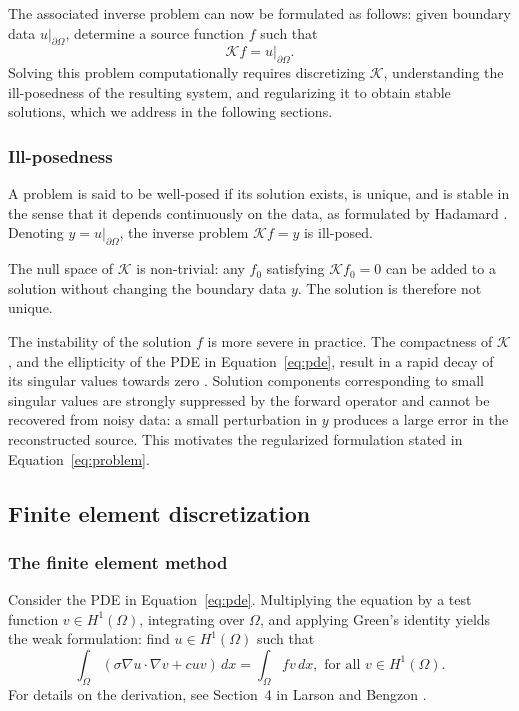 The associated inverse problem can now be formulated as follows: given boundary data $u|_{\partial\Omega}$, determine a source function $f$ such that
\begin{equation*}
    \mathcal{K} f = u|_{\partial\Omega}.
\end{equation*}
Solving this problem computationally requires discretizing $\mathcal{K}$, understanding the ill-posedness of the resulting system, and regularizing it to obtain stable solutions, which we address in the following sections.


\subsubsection{Ill-posedness}\label{sec:ill_posedness}
A problem is said to be well-posed if its solution exists, is unique, and is stable in the sense that it depends continuously on the data, as formulated by Hadamard \cite{hansen2010discrete}. Denoting $y = u|_{\partial\Omega}$, the inverse problem $\mathcal{K}f = y$ is ill-posed.

The null space of $\mathcal{K}$ is non-trivial: any $f_0$ satisfying $\mathcal{K}f_0 = 0$ can be added to a solution without changing the boundary data $y$. The solution is therefore not unique.

The instability of the solution $f$ is more severe in practice. The compactness of $\mathcal{K}$, and the ellipticity of the PDE in Equation~\eqref{eq:pde}, result in a rapid decay of its singular values towards zero \cite{evansPartialDifferentialEquations2010,engl1996regularization}. Solution components corresponding to small singular values are strongly suppressed by the forward operator and cannot be recovered from noisy data: a small perturbation in $y$ produces a large error in the reconstructed source. This motivates the regularized formulation stated in Equation~\eqref{eq:problem}.


\subsection{Finite element discretization}
\subsubsection{The finite element method}

Consider the PDE in Equation~\eqref{eq:pde}. Multiplying the equation by a test function $v \in H^1(\Omega)$, integrating over $\Omega$, and applying Green's identity yields the weak formulation: find $u \in H^1(\Omega)$ such that
\begin{equation}\label{eq:variational_formulation}
    \int_{\Omega} (\sigma \nabla u \cdot \nabla v + c u v) \, dx = \int_{\Omega} f v \, dx,
    \text{ for all } v \in H^1(\Omega).
\end{equation}
For details on the derivation, see Section~4 in Larson and Bengzon \cite{larsonFiniteElementMethod2013}.

